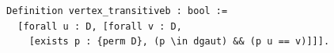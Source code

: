 \begin{lstlisting}[language=Rocq]
Definition vertex_transitiveb : bool :=
  [forall u : D, [forall v : D,
    [exists p : {perm D}, (p \in dgaut) && (p u == v)]]].
\end{lstlisting}
